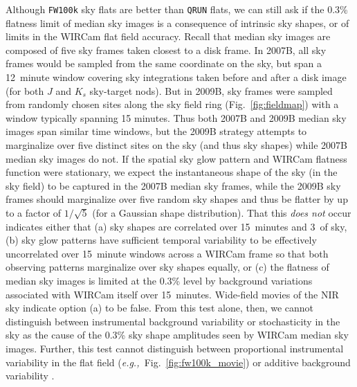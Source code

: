 \documentclass[iop]{emulateapj}
\newcommand{\eg}{\textit{e.g.,~}}
\newcommand{\todo}[1]{\textcolor{BurntOrange}{\textsf{#1}}} %
\newcommand{\mycomment}[1]{\textcolor{OliveGreen}{\textit{#1}}} %
\newcommand{\Fig}[1]{Fig.~\ref{fig:#1}}  %
\begin{document}
Although \texttt{FW100k} sky flats are better than \texttt{QRUN} flats, we can still ask if the 0.3\% flatness limit of median sky images is a consequence of intrinsic sky shapes, or of limits in the WIRCam flat field accuracy.
Recall that median sky images are composed of five sky frames taken closest to a disk frame.
In 2007B, all sky frames would be sampled from the same coordinate on the sky, but span a 12~minute window covering sky integrations taken before and after a disk image (for both $J$ and $K_s$ sky-target nods).
But in 2009B, sky frames were sampled from randomly chosen sites along the sky field ring (\Fig{fieldmap}) with a window typically spanning 15 minutes.
Thus both 2007B and 2009B median sky images span similar time windows, but the 2009B strategy attempts to marginalize over five distinct sites  on the sky (and thus sky shapes) while 2007B median sky images do not.
If the spatial sky glow pattern and WIRCam flatness function were stationary, we expect the instantaneous shape of the sky (in the sky field) to be captured in the 2007B median sky frames, while the 2009B sky frames should marginalize over five random sky shapes and thus be flatter by up to a factor of $1/\sqrt{5}$ (for a Gaussian shape distribution).
That this \emph{does not} occur indicates either that (a) sky shapes are correlated over 15~minutes and 3\arcdeg\ of sky, (b) sky glow patterns have sufficient temporal variability to be effectively uncorrelated over 15~minute windows across a WIRCam frame so that both observing patterns marginalize over sky shapes equally, or (c) the flatness of median sky images is limited at the 0.3\% level by background variations associated with WIRCam itself over 15~minutes.
Wide-field movies of the NIR sky \citep{Adams:1996} indicate option (a) to be false.
From this test alone, then, we cannot distinguish between instrumental background variability or stochasticity in the sky as the cause of the 0.3\% sky shape amplitudes seen by WIRCam median sky images.
Further, this test cannot distinguish between proportional instrumental variability in the flat field (\eg \Fig{fw100k_movie}) or additive background variability \citep[as seen in the CFHT-IR camera,][]{Vaduvescu:2004}.

\end{document}
